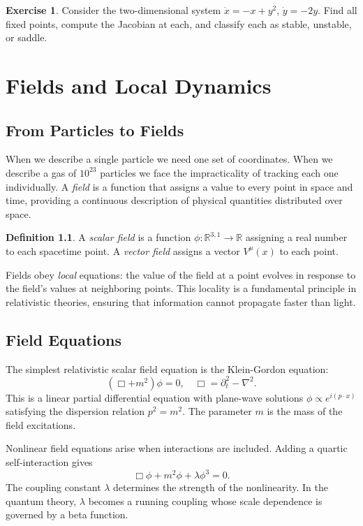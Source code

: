 \documentclass[12pt,a4paper,oneside]{book}
\theoremstyle{definition}
\newtheorem{definition}{Definition}[chapter]
\newtheorem{exercise}{Exercise}[chapter]
\theoremstyle{plain}
\theoremstyle{remark}
\begin{document}
\begin{exercise}
Consider the two-dimensional system $\dot x = -x + y^2$, $\dot y = -2y$.
Find all fixed points, compute the Jacobian at each, and classify each as
stable, unstable, or saddle.
\end{exercise}

\chapter{Fields and Local Dynamics}

\section{From Particles to Fields}

When we describe a single particle we need one set of coordinates. When we
describe a gas of $10^{23}$ particles we face the impracticality of tracking
each one individually. A \emph{field} is a function that assigns a value to
every point in space and time, providing a continuous description of physical
quantities distributed over space.

\begin{definition}
A \emph{scalar field} is a function $\phi: \mathbb{R}^{3,1} \to \mathbb{R}$
assigning a real number to each spacetime point. A \emph{vector field} assigns
a vector $V^\mu(x)$ to each point.
\end{definition}

Fields obey \emph{local} equations: the value of the field at a point evolves
in response to the field's values at neighboring points. This locality is a
fundamental principle in relativistic theories, ensuring that information
cannot propagate faster than light.

\section{Field Equations}

The simplest relativistic scalar field equation is the Klein-Gordon equation:
\begin{equation}
(\Box + m^2)\phi = 0,
\quad
\Box = \partial_t^2 - \nabla^2.
\end{equation}
This is a linear partial differential equation with plane-wave solutions
$\phi \propto e^{i(p\cdot x)}$ satisfying the dispersion relation $p^2 = m^2$.
The parameter $m$ is the mass of the field excitations.

Nonlinear field equations arise when interactions are included. Adding a
quartic self-interaction gives
\begin{equation}
\Box\phi + m^2\phi + \lambda\phi^3 = 0.
\end{equation}
The coupling constant $\lambda$ determines the strength of the nonlinearity.
In the quantum theory, $\lambda$ becomes a running coupling whose scale
dependence is governed by a beta function.
\end{document}
